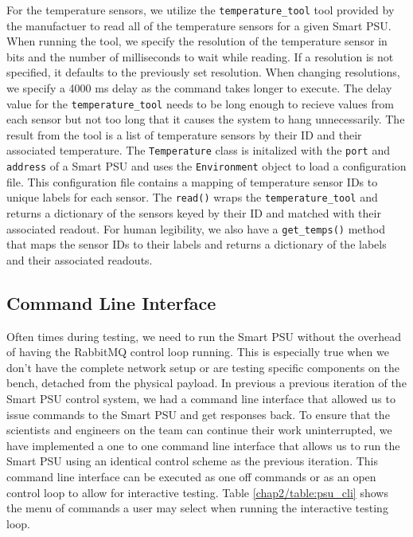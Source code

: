 For the temperature sensors, we utilize the \texttt{temperature\_tool} tool provided by the manufactuer to read all of the temperature sensors for a given Smart PSU. 
When running the tool, we specify the resolution of the temperature sensor in bits and the number of milliseconds to wait while reading.
If a resolution is not specified, it defaults to the previously set resolution.
When changing resolutions, we specify a 4000 ms delay as the command takes longer to execute. 
The delay value for the \texttt{temperature\_tool} needs to be long enough to recieve values from each sensor but not too long that it causes the system to hang unnecessarily.
The result from the tool is a list of temperature sensors by their ID and their associated temperature.
The \texttt{Temperature} class is initalized with the \texttt{port} and \texttt{address} of a Smart PSU and uses the \texttt{Environment} object to load a configuration file. 
This configuration file contains a mapping of temperature sensor IDs to unique labels for each sensor.
The \texttt{read()} wraps the \texttt{temperature\_tool} and returns a dictionary of the sensors keyed by their ID and matched with their associated readout.
For human legibility, we also have a \texttt{get\_temps()} method that maps the sensor IDs to their labels and returns a dictionary of the labels and their associated readouts.

\subsection{Command Line Interface}

Often times during testing, we need to run the Smart PSU without the overhead of having the RabbitMQ control loop running.
This is especially true when we don't have the complete network setup or are testing specific components on the bench, detached from the physical payload. 
In previous a previous iteration of the Smart PSU control system, we had a command line interface that allowed us to issue commands to the Smart PSU and get responses back.
To ensure that the scientists and engineers on the team can continue their work uninterrupted, we have implemented a one to one command line interface that allows us to run the Smart PSU using an identical control scheme as the previous iteration.
This command line interface can be executed as one off commands or as an open control loop to allow for interactive testing.
Table \ref{chap2/table:psu_cli} shows the menu of commands a user may select when running the interactive testing loop.

